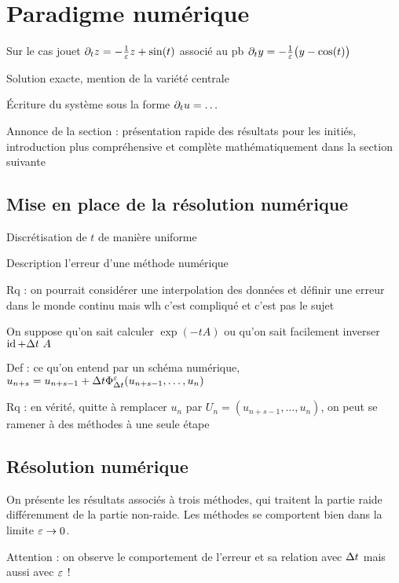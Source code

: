 \section*{Paradigme numérique}

Sur le cas jouet $\partial_t z = -\frac{1}{\varepsilon}z + \sin(t)$ associé au pb $\partial_t y = -\frac{1}{\varepsilon} \big( y - \cos(t) \big)$

Solution exacte, mention de la variété centrale

Écriture du système sous la forme $\partial_t u = \ldots$

Annonce de la section : présentation rapide des résultats pour les initiés, introduction plus compréhensive et complète mathématiquement dans la section suivante


\subsection*{Mise en place de la résolution numérique}

Discrétisation de $t$ de manière uniforme

Description l’erreur d’une méthode numérique 

Rq : on pourrait considérer une interpolation des données et définir une erreur dans le monde continu mais wlh c’est compliqué et c’est pas le sujet

On suppose qu’on sait calculer $\exp(-t A)$ ou qu’on sait facilement inverser $\id + \Dt \ A$

Def : ce qu’on entend par un schéma numérique, $u_{n+s} = u_{n+s-1} + \Delta t \Phi^{\varepsilon}_{\Delta t} (u_{n+s-1}, \ldots, u_n)$

Rq : en vérité, quitte à remplacer $u_n$ par $U_n = (u_{n+s-1}, \ldots, u_n)$, on peut se ramener à des méthodes à une seule étape


\subsection*{Résolution numérique}

On présente les résultats associés à trois méthodes, qui traitent la partie raide différemment de la partie non-raide. Les méthodes se comportent bien dans la limite $\varepsilon \rightarrow 0$.

Attention : on observe le comportement de l’erreur et sa relation avec $\Delta t$ mais aussi avec $\varepsilon$ !

